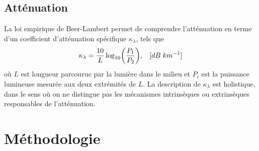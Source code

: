 \documentclass[10pt,letterpaper,twocolumn]{article}
\newcommand{\s}{\hspace{0.1cm}}
\DeclarePairedDelimiter\autobracket{(}{)}
\newcommand{\br}[1]{\autobracket*{#1}}
\begin{document}
\subsection{Atténuation}

La loi empirique de Beer-Lambert permet de comprendre l'atténuation en terme d'un coefficient d'atténuation spécifique $\kappa_\lambda$, tels que\supercite{Pedrotti}
\begin{equation}\label{eq:BeerLambert}
	\kappa_\lambda = \frac{10}{L}\log_{10}\br{\frac{P_1}{P_2}},\s\s\s [dB\s km^{-1}]
\end{equation}
où $L$ est longueur parcourue par la lumière dans le milieu et $P_i$ est la puissance lumineuse mesurée aux deux extrémités de $L$. La description de $\kappa_\lambda$ est holistique, dans le sens où on ne distingue pas les mécanismes intrinsèques ou extrinsèques responsables de l'atténuation. 

\section{Méthodologie}\label{sec:metho} %
\end{document}
